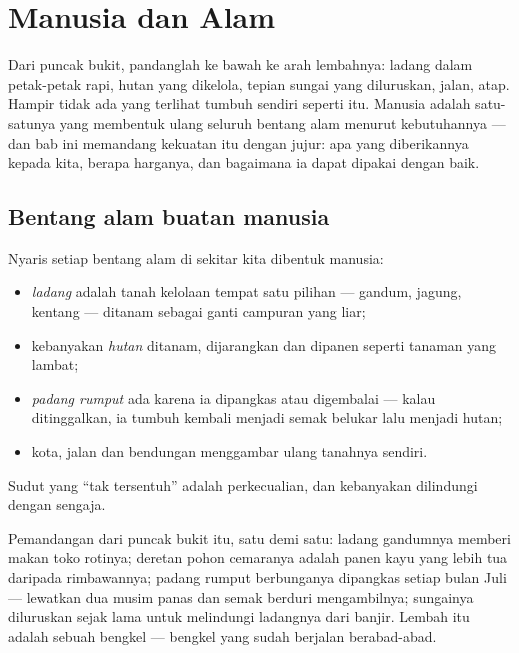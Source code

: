 \chapter{Manusia dan Alam}\label{ch:g5:people-and-nature}

Dari puncak bukit, pandanglah ke bawah ke arah lembahnya: ladang dalam
petak-petak rapi, hutan yang dikelola, tepian sungai yang diluruskan,
jalan, atap. Hampir tidak ada yang terlihat tumbuh sendiri seperti itu.
Manusia adalah satu-satunya  yang membentuk ulang seluruh
bentang alam menurut kebutuhannya --- dan bab ini memandang kekuatan
itu dengan jujur: apa yang diberikannya kepada kita, berapa harganya,
dan bagaimana ia dapat dipakai dengan baik.

\section{Bentang alam buatan manusia}

\begin{proposition}\label{prop:g5:people-and-nature:managed}
Nyaris setiap bentang alam di sekitar kita dibentuk manusia:
\begin{itemize}
  \item \emph{ladang} adalah tanah kelolaan tempat satu
         pilihan --- gandum, jagung, kentang --- ditanam
        sebagai ganti campuran yang liar;
  \item kebanyakan \emph{hutan} ditanam,
        dijarangkan dan dipanen seperti tanaman yang lambat;
  \item \emph{padang rumput} ada karena ia dipangkas atau digembalai
        --- kalau ditinggalkan, ia tumbuh kembali menjadi semak
        belukar lalu menjadi hutan;
  \item kota, jalan dan bendungan menggambar ulang tanahnya sendiri.
\end{itemize}
Sudut yang ``tak tersentuh'' adalah perkecualian, dan kebanyakan
dilindungi dengan sengaja.
\end{proposition}
\admitted

\begin{example}\label{ex:g5:people-and-nature:valley}
Pemandangan dari puncak bukit itu, satu demi satu: ladang gandumnya
memberi makan toko rotinya; deretan pohon cemaranya adalah panen kayu
yang lebih tua daripada rimbawannya; padang rumput berbunganya
dipangkas setiap bulan Juli --- lewatkan dua musim panas dan semak
berduri mengambilnya; sungainya diluruskan sejak lama untuk melindungi
ladangnya dari banjir. Lembah itu adalah sebuah bengkel --- bengkel
yang sudah berjalan berabad-abad.
\end{example}

